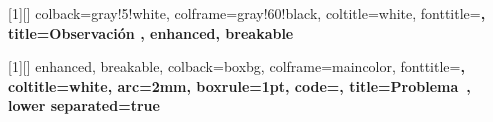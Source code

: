 [1][]{
    colback=gray!5!white,
    colframe=gray!60!black,
    coltitle=white,
    fonttitle=\bfseries,
    title={Observación },
    enhanced,
    breakable
}

\newenvironment{demostracion}[1][Demostración]{%
    \par\vspace{0.5em}\noindent
    \tcbset{
        enhanced,
        colback=gray!3!white,
        colframe=gray!50!black,
        boxrule=0pt,
        leftrule=3pt,
        arc=0pt,
        outer arc=0pt,
        top=6pt, bottom=6pt, left=10pt, right=10pt,
        breakable
    }%
    \begin{tcolorbox}%
    \textbf{#1.}\,%
}{%
    \hfill$\square$%
    \end{tcolorbox}\par\vspace{0.5em}%
}

[1][]{
  enhanced,
  breakable,
  colback=boxbg,
  colframe=maincolor,
  fonttitle=\bfseries,
  coltitle=white,
  arc=2mm,
  boxrule=1pt,
  code={},
  title={Problema~\theproblemacontador{}},
  lower separated=true
}


\newcommand{\R}{\mathbb{R}}
\newcommand{\N}{\mathbb{N}}
\newcommand{\Z}{\mathbb{Z}}
\newcommand{\Q}{\mathbb{Q}}

\newcommand{\cA}{\mathcal{A}}
\newcommand{\cB}{\mathcal{B}}
\newcommand{\cF}{\mathcal{F}}
\newcommand{\cG}{\mathcal{G}}

\newcommand{\Pprob}{\mathbb{P}}
\newcommand{\Eesperanza}{\mathbb{E}}
\newcommand{\Vvarianza}{\mathrm{Var}}
\newcommand{\medida}{\mu}